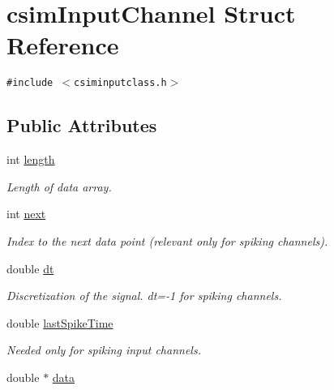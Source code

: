 \hypertarget{structcsimInputChannel}{
\section{csim\-Input\-Channel Struct Reference}
\label{structcsimInputChannel}
}
{\tt \#include $<$csiminputclass.h$>$}

\subsection*{Public Attributes}
\begin{CompactItemize}
\item 
\hypertarget{structcsimInputChannel_o0}{
int \hyperlink{structcsimInputChannel_o0}{length}}
\label{structcsimInputChannel_o0}

\begin{CompactList}\small\item\em Length of data array. \item\end{CompactList}\item 
\hypertarget{structcsimInputChannel_o1}{
int \hyperlink{structcsimInputChannel_o1}{next}}
\label{structcsimInputChannel_o1}

\begin{CompactList}\small\item\em Index to the next data point (relevant only for spiking channels). \item\end{CompactList}\item 
\hypertarget{structcsimInputChannel_o2}{
double \hyperlink{structcsimInputChannel_o2}{dt}}
\label{structcsimInputChannel_o2}

\begin{CompactList}\small\item\em Discretization of the signal. dt=-1 for spiking channels. \item\end{CompactList}\item 
\hypertarget{structcsimInputChannel_o3}{
double \hyperlink{structcsimInputChannel_o3}{last\-Spike\-Time}}
\label{structcsimInputChannel_o3}

\begin{CompactList}\small\item\em Needed only for spiking input channels. \item\end{CompactList}\item 
\hypertarget{structcsimInputChannel_o4}{
double $\ast$ \hyperlink{structcsimInputChannel_o4}{data}}
\label{structcsimInputChannel_o4}


\end{CompactItemize}
